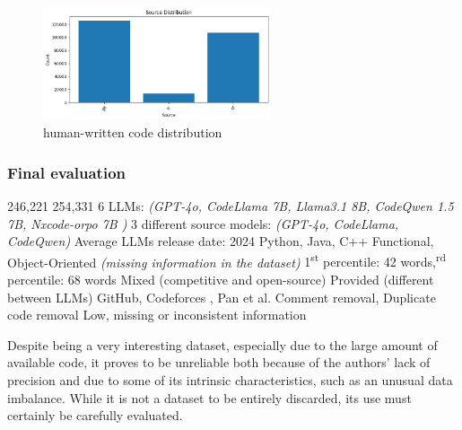 \begin{figure}[H]
    \centering
    \includegraphics[width=0.6\textwidth]{img/CoDet-M4/lc_less.png}
    \caption{human-written code distribution}
    \label{fig:human-written_code_distribution}
\end{figure}



\clearpage %

\subsubsection*{Final evaluation}

\expandafter\def\csname CoDetM4HumanCode\endcsname{246,221}
\expandafter\def\csname CoDetM4LLMCode\endcsname{254,331}
\expandafter\def\csname CoDetM4NumLLMs\endcsname{6 LLMs: \textit{(GPT-4o, CodeLlama 7B, Llama3.1 8B, CodeQwen 1.5 7B, Nxcode-orpo 7B )}}
\expandafter\def\csname CoDetM4LLMDiversity\endcsname{3 different source models: \textit{(GPT-4o, CodeLlama, CodeQwen) }}
\expandafter\def\csname CoDetM4CurrentUse\endcsname{Average LLMs release date: 2024}
\expandafter\def\csname CoDetM4Languages\endcsname{Python, Java, C++}
\expandafter\def\csname CoDetM4CodeTypes\endcsname{Functional, Object-Oriented \textit{(missing information in the dataset)}}
\expandafter\def\csname CoDetM4CodeSize\endcsname{1\textsuperscript{st} percentile: 42 words,\textsuperscript{rd} percentile: 68 words}
\expandafter\def\csname CoDetM4CodeContext\endcsname{Mixed (competitive and open-source)}
\expandafter\def\csname CoDetM4Prompts\endcsname{Provided (different between LLMs)}
\expandafter\def\csname CoDetM4Sources\endcsname{GitHub, Codeforces \cite{CodeforcesKaggle}, Pan et al. \cite{pan2024assessing}}
\expandafter\def\csname CoDetM4CodeQuality\endcsname{Comment removal, Duplicate code removal}
\expandafter\def\csname CoDetM4Reliability\endcsname{Low, missing or inconsistent information}




Despite being a very interesting dataset, 
especially due to the large amount of available code, 
it proves to be unreliable both because of the authors' 
lack of precision and due to some of its intrinsic 
characteristics, such as an unusual data imbalance. 
While it is not a dataset to be entirely discarded, 
its use must certainly be carefully evaluated.